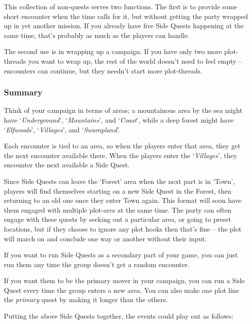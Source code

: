 \begin{multicols}{2}
This collection of non-quests serves two functions.
The first is to provide some short encounter when the time calls for it, but without getting the party wrapped up in yet another mission.
If you already have five Side Quests happening at the same time, that's probably as much as the players can handle.

The second use is in wrapping up a campaign.
If you have only two more plot-threads you want to wrap up, the rest of the world doesn't need to feel empty -- encounters can continue, but they needn't start more plot-threads.

\subsubsection{Summary}

Think of your campaign in terms of areas; a mountainous area by the sea might have `\emph{Underground}', `\emph{Mountains}', and `\emph{Coast}', while a deep forest might have `\emph{Elfwoods}', `\emph{Villages}', and `\emph{Swampland}'.

Each encounter is tied to an area, so when the players enter that area, they get the next encounter available there.
When the players enter the `\emph{Villages}', they encounter the next available a Side Quest.

Since Side Quests can leave the `Forest' area when the next part is in `Town', players will find themselves starting on a new Side Quest in the Forest, then returning to an old one once they enter Town again.
This format will soon have them engaged with multiple plot-arcs at the same time.
The party can often engage with these quests by seeking out a particular area, or going to preset locations, but if they choose to ignore any plot hooks then that's fine -- the plot will march on and conclude one way or another without their input.

If you want to run Side Quests as a secondary part of your game, you can just run them any time the group doesn't get a random encounter.

If you want them to be the primary mover in your campaign, you can run a Side Quest every time the group enters a new area.
You can also make one plot line the \emph{primary} quest by making it longer than the others.

Putting the above Side Quests together, the events could play out as follows:

\begin{enumerate}


\end{enumerate}
\end{multicols}
